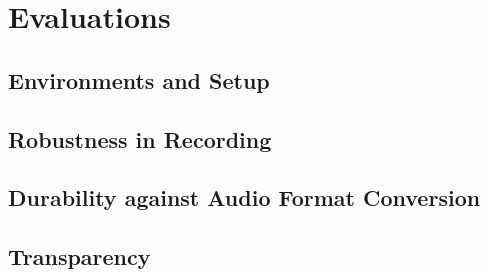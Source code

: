 \chapter{Evaluations}

\section{Environments and Setup}


\section{Robustness in Recording}


\section{Durability against Audio Format Conversion}


\section{Transparency}
